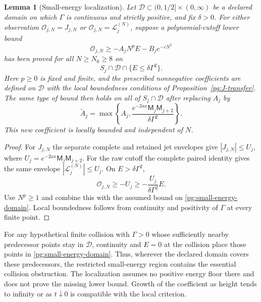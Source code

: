 \documentclass[11pt]{article}
\numberwithin{equation}{section}
\newtheorem{lemma}[theorem]{Lemma}
\theoremstyle{definition}
\theoremstyle{remark}
\newcommand{\Lag}{\mathcal L}
\begin{document}
\begin{lemma}[Small-energy localization]
\label{pg:small-energy}
Let $\mathcal D\subset(0,1/2]\times(0,\infty)$ be a declared domain
on which $\Gamma$ is continuous and strictly positive, and fix $\delta>0$.
For either observation
$\mathcal O_{j,N}=J_{j,N}$ or $\mathcal O_{j,N}=\Lag_j^{(N)}$,
suppose a polynomial-cutoff lower bound
\[
 \mathcal O_{j,N}\ge-A_jN^pE-B_je^{-cN^2}
\]
has been proved for all $N\ge N_0\ge8$ on
\begin{equation}
 S_j\cap\mathcal D\cap\{E\le\delta\Gamma^2\}.
 \label{pg:small-energy-domain}
\end{equation}
Here $p\ge0$ is fixed and finite, and the prescribed nonnegative
coefficients are defined on $\mathcal D$ with the local boundedness
conditions of Proposition~\ref{pg:J-transfer}.  The same type of
bound then holds on all of $S_j\cap\mathcal D$ after replacing $A_j$ by
\begin{equation}
 \widetilde A_j=
 \max\left\{A_j,
   \frac{e^{-2ax}\mathsf M_j\mathsf M_{j+2}}
        {\delta\Gamma^2}\right\}.
 \label{pg:extended-coefficient}
\end{equation}
This new coefficient is locally bounded and independent of $N$.
\end{lemma}

\begin{proof}
For $J_{j,N}$ the separate complete and retained jet envelopes give
$|J_{j,N}|\le U_j$, where
$U_j=e^{-2ax}\mathsf M_j\mathsf M_{j+2}$.
For the raw cutoff the complete paired identity gives the same
envelope $|\Lag_j^{(N)}|\le U_j$.  On $E>\delta\Gamma^2$,
\[
 \mathcal O_{j,N}\ge-U_j
       \ge-\frac{U_j}{\delta\Gamma^2}E.
\]
Use $N^p\ge1$ and combine this with the assumed bound on
\eqref{pg:small-energy-domain}.  Local boundedness follows from
continuity and positivity of $\Gamma$ at every finite point.
\end{proof}

For any hypothetical finite collision with $\Gamma>0$ whose sufficiently
nearby predecessor points stay in $\mathcal D$, continuity and $E=0$
at the collision place those points in \eqref{pg:small-energy-domain}.
Thus, wherever the declared domain covers these predecessors, the
restricted small-energy region contains the essential collision obstruction.  The
localization assumes no positive energy floor there and does not prove
the missing lower bound.  Growth of the coefficient as height tends to
infinity or as $t\downarrow0$ is compatible with the local criterion.
\end{document}
